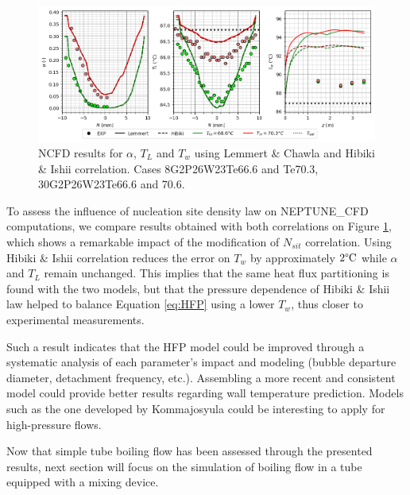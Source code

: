 %
\begin{figure}[h!]
\centering
\includegraphics[scale=0.60]{img/DEBORA/plot_HI.png}
\caption{NCFD results for $\alpha$, $T_{L}$ and $T_{w}$ using {Lemmert} \& {Chawla} and {Hibiki} \& {Ishii} correlation. Cases 8G2P26W23Te66.6 and Te70.3, 30G2P26W23Te66.6 and 70.6.}
\label{fig:NCFD_nsit}
\end{figure}
%
To assess the influence of nucleation site density law on NEPTUNE\_CFD computations, we compare results obtained with both correlations on Figure \ref{fig:NCFD_nsit}, which shows a remarkable impact of the modification of $N_{sit}$ correlation. Using {Hibiki} \& {Ishii} correlation reduces the error on $T_{w}$ by approximately $2\degree\text{C}$ while $\alpha$ and $T_{L}$ remain unchanged. This implies that the same heat flux partitioning is found with the two models, but that the pressure dependence of {Hibiki} \& {Ishii} law helped to balance Equation \ref{eq:HFP} using a lower $T_{w}$, thus closer to experimental measurements.

Such a result indicates that the HFP model could be improved through a systematic analysis of each parameter's impact and modeling (bubble departure diameter, detachment frequency, etc.). Assembling a more recent and consistent model could provide better results regarding wall temperature prediction. Models such as the one developed by {Kommajosyula}\cite{kommajosyula_development_2020} could be interesting to apply for high-pressure flows.


Now that simple tube boiling flow has been assessed through the presented results, next section will focus on the simulation of boiling flow in a tube equipped with a mixing device.%
